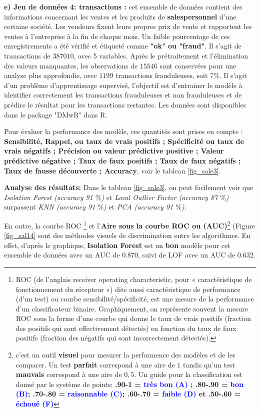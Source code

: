 \noindent \textbf{e) Jeu de données 4: transactions :} cet ensemble de données contient des informations concernant les ventes et les produits de \textbf{salespersonnel} d'une certaine société. Les vendeurs fixent leurs propres prix de vente et rapportent les ventes à l'entreprise à la fin de chaque mois. Un faible pourcentage de ces enregistrements a été vérifié et étiqueté comme \textbf{"ok" ou "fraud"}. Il s'agit de transactions de $387010$, avec 5 variables. Après le prétraitement et l'élimination des valeurs manquantes, les observations de $15546$ sont conservées pour une analyse plus approfondie, avec $1199$ transactions frauduleuses, soit $7 \%$. Il s'agit d'un problème d'apprentissage supervisé, l'objectif est d'entrainer le modèle à identifier correctement les transactions frauduleuses et non frauduleuses et de prédire le résultat pour les transactions restantes. Les données sont disponibles dans le package "DMwR" dans R.  

Pour évaluer la performance des modèle, ces quantités sont prises en compte : \textbf{
Sensibilité, Rappel, ou taux de vrais positifs ; Spécificité ou taux de vrais négatifs ; Précision ou valeur prédictive positive ; Valeur prédictive négative ; Taux de faux positifs ; Taux de faux négatifs ; Taux de fausse découverte ; Accuracy}, voir le tableau \ref{fig_sale3}.

\noindent\textbf{Analyse des résultats:} Dans le tableau \eqref{fig_sale3}, on peut facilement voir que \textit{Isolation Forest (accuracy 91 $\%$)} et \textit{Local Outlier Factor (accuracy 87 $\%$)} surpassent \textit{KNN (accuracy 91 $\%$)} et \textit{PCA (accuracy 91 $\%$)}.

En outre, la courbe ROC \footnote{ROC (de l’anglais receiver operating characteristic, pour « caractéristique de fonctionnement du récepteur ») dite aussi caractéristique de performance (d'un test) ou courbe sensibilité/spécificité, est une mesure de la performance d'un classificateur binaire. Graphiquement, on représente souvent la mesure ROC sous la forme d'une courbe qui donne le taux de vrais positifs (fraction des positifs qui sont effectivement détectés) en fonction du taux de faux positifs (fraction des négatifs qui sont incorrectement détectés).} et l'\textbf{Aire sous la courbe ROC ou (AUC)}\footnote{c'est un outil \textbf{visuel} pour mesurer la performence  des modèles et de les comparer. Un test \textbf{parfait} correspond à une aire de $1$ tandis qu'un test \textbf{mauvais} correspond à une aire de $0,5$. Un guide pour la classification est donné par le système de points: \textbf{
.90-1 = \textcolor{blue}{très bon (A)} ; .80-.90 = \textcolor{blue}{bon (B)}; .70-.80 = \textcolor{blue}{raisonnable (C)}; .60-.70 = \textcolor{blue}{faible (D)} et .50-.60 = \textcolor{blue}{échoué (F)}}\cite{ROC}} (Figure \ref{fig_sal14}
sont des méthodes visuels de discrimination entre les algorithmes. En effet, d'après le graphique, \textbf{Isolation Forest} est un \textbf{bon} modèle pour cet ensemble de données avec un AUC de $0.870$, suivi de LOF avec un AUC de $0.632$.

